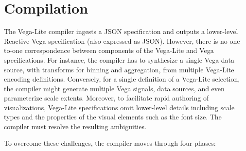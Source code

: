 
\vspace{-10pt}

\section{Compilation}
\label{sec:vl:compiler}

\vspace{-10pt}

The Vega-Lite compiler ingests a JSON specification and outputs a lower-level
Reactive Vega specification (also expressed as JSON). However, there is no
one-to-one correspondence between components of the Vega-Lite and Vega
specifications. For instance, the compiler has to synthesize a single Vega data
source, with transforms for binning and aggregation, from multiple Vega-Lite
encoding definitions. Conversely, for a single definition of a Vega-Lite
selection, the compiler might generate multiple Vega signals, data sources, and
even parameterize scale extents. Moreover, to facilitate rapid authoring of
visualizations, Vega-Lite specifications omit lower-level details including
scale types and the properties of the visual elements such as the font size. The
compiler must resolve the resulting ambiguities.

To overcome these challenges, the compiler moves through four phases:

